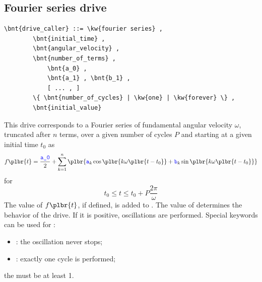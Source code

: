 \subsection{Fourier series drive}
\begin{Verbatim}[commandchars=\\\{\}]
    \bnt{drive_caller} ::= \kw{fourier series} ,
        \bnt{initial_time} ,
        \bnt{angular_velocity} ,
        \bnt{number_of_terms} ,
            \bnt{a_0} ,
            \bnt{a_1} , \bnt{b_1} ,
            [ ... , ]
        \{ \bnt{number_of_cycles} | \kw{one} | \kw{forever} \} , 
        \bnt{initial_value}
\end{Verbatim}
This drive corresponds to a Fourier series of fundamental
angular velocity $\omega$,
truncated after $n$ terms, over a given number of cycles $P$ and starting 
at a given initial time $t_0$ as
\begin{displaymath}
	f\plbr{t} = \frac{\nt{a\_0}}{2} + \sum_{k=1}^n \plbr{
		\nt{a}_k \cos\plbr{k\omega\plbr{t - t_0}}
		+ \nt{b}_k \sin\plbr{k\omega\plbr{t - t_0}}
	}
\end{displaymath}
for
\begin{displaymath}
	t_0 \le t \le t_0 + P \frac{2 \pi}{\omega}
\end{displaymath}
The value of $f\plbr{t}$, if defined, is added to .
The value of  determines the behavior of the
drive. 
If it is positive,  oscillations are
performed.
Special keywords can be used for :
\begin{itemize}
	\item {}: the oscillation never stops;
	\item {}: exactly one cycle is performed;
\end{itemize}
the  must be at least 1.

